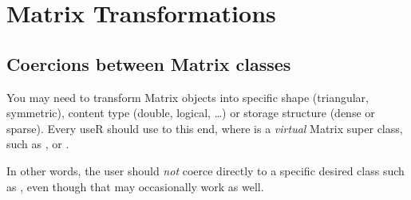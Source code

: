 \documentclass{article}
\begin{document}
\section{Matrix Transformations}
\label{sec:trafos}

\subsection{Coercions between Matrix classes}
\label{ssec:coerce}

You may need to transform Matrix objects into specific shape (triangular,
symmetric), content type (double, logical, \dots) or storage structure
(dense or sparse).
Every useR should use  to this end, where
 is a \emph{virtual} Matrix super class, such as
 , or .

In other words, the user should \emph{not} coerce directly to a specific
desired class such as , even though that may
occasionally work as well.
\end{document}
